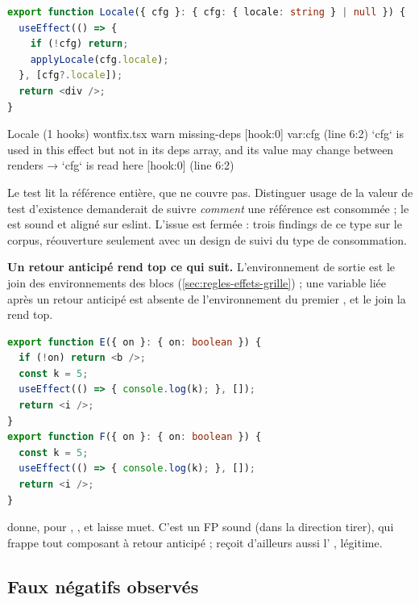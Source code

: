 \begin{decision}
\begin{lstlisting}[language=TypeScript]
export function Locale({ cfg }: { cfg: { locale: string } | null }) {
  useEffect(() => {
    if (!cfg) return;
    applyLocale(cfg.locale);
  }, [cfg?.locale]);
  return <div />;
}
\end{lstlisting}
\begin{sortie}
  Locale  (1 hooks)  wontfix.tsx
    warn   missing-deps  [hook:0]  var:cfg  (line 6:2)  `cfg` is used in this effect but not in its deps array, and its value may change between renders
       → `cfg` is read here [hook:0] (line 6:2)
\end{sortie}
Le test  lit la référence entière, que  ne couvre pas. Distinguer \og usage de la valeur\fg{} de \og test d'existence\fg{} demanderait de suivre \emph{comment} une référence est consommée ; le \Warning{} est sound et aligné sur eslint. L'issue  est fermée  : trois findings de ce type sur le corpus, réouverture seulement avec un design de suivi du type de consommation.
\end{decision}

\begin{piege}
\textbf{Un retour anticipé rend top ce qui suit.} L'environnement de sortie est le join des environnements des blocs  (\cref{sec:regles-effets-grille}) ; une variable liée après un retour anticipé est absente de l'environnement du premier , et le join la rend top.
\begin{lstlisting}[language=TypeScript]
export function E({ on }: { on: boolean }) {
  if (!on) return <b />;
  const k = 5;
  useEffect(() => { console.log(k); }, []);
  return <i />;
}
export function F({ on }: { on: boolean }) {
  const k = 5;
  useEffect(() => { console.log(k); }, []);
  return <i />;
}
\end{lstlisting}
 donne, pour , \og {}\fg{}, et laisse  muet. C'est un FP sound (dans la direction \og tirer\fg{}), qui frappe tout composant à retour anticipé ;  reçoit d'ailleurs aussi l'\Error{} , légitime.
\end{piege}

\subsection{Faux négatifs observés}

